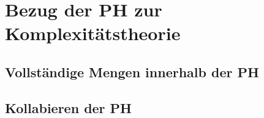 \chapter{Bezug der PH zur Komplexitätstheorie} \label{chapter: Bezug der PH zur Komplexitätstheorie}
\section{Vollständige Mengen innerhalb der PH} \label{section: Vollständige Mengen innerhalb der PH}

\section{Kollabieren der PH} \label{section: Kollabieren der PH}
